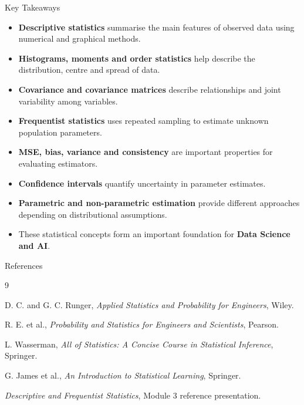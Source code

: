\documentclass{beamer}
\begin{document}
\begin{frame}{Key Takeaways}

\begin{itemize}
    \item \textbf{Descriptive statistics} summarise the main features
          of observed data using numerical and graphical methods.

    \item \textbf{Histograms, moments and order statistics} help describe
          the distribution, centre and spread of data.

    \item \textbf{Covariance and covariance matrices} describe
          relationships and joint variability among variables.

    \item \textbf{Frequentist statistics} uses repeated sampling to
          estimate unknown population parameters.

    \item \textbf{MSE, bias, variance and consistency} are important
          properties for evaluating estimators.

    \item \textbf{Confidence intervals} quantify uncertainty in
          parameter estimates.

    \item \textbf{Parametric and non-parametric estimation} provide
          different approaches depending on distributional assumptions.

    \item These statistical concepts form an important foundation
          for \textbf{Data Science and AI}.
\end{itemize}

\end{frame}



\begin{frame}{References}

\begin{thebibliography}{9}

D. C. and G. C. Runger,
\textit{Applied Statistics and Probability for Engineers},
Wiley.

R. E. et al.,
\textit{Probability and Statistics for Engineers and Scientists},
Pearson.

L. Wasserman,
\textit{All of Statistics: A Concise Course in Statistical Inference},
Springer.

G. James et al.,
\textit{An Introduction to Statistical Learning},
Springer.

\textit{Descriptive and Frequentist Statistics},
Module 3 reference presentation.

\end{thebibliography}

\end{frame}
\end{document}
